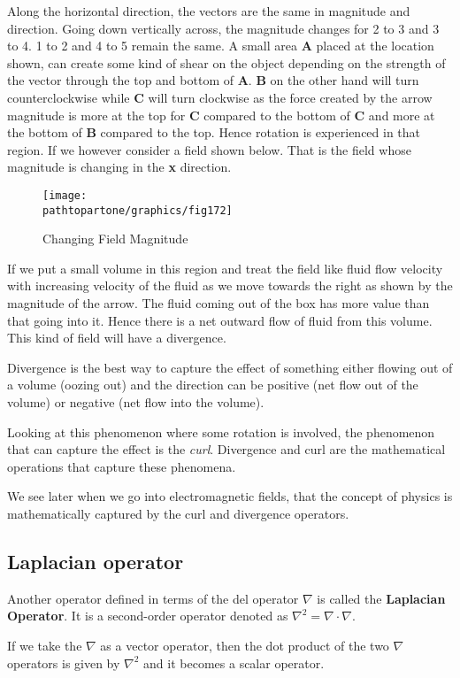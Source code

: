 Along the horizontal direction, the vectors are the same in magnitude and direction. Going down vertically across, the magnitude changes for 2 to 3 and 3 to 4. 1 to 2 and 4 to 5 remain the same. A small area \textbf{A} placed at the location shown, can create some kind of shear on the object depending on the strength of the vector through the top and bottom of \textbf{A}. \textbf{B} on the other hand will turn counterclockwise while \textbf{C} will turn clockwise as the force created by the arrow magnitude is more at the top for \textbf{C} compared to the bottom of \textbf{C} and more at the bottom of \textbf{B} compared to the top. Hence rotation is experienced in that region. If we however consider a field shown below. That is the field whose magnitude is changing in the \textbf{x} direction.
\begin{figure}[h]
\centering
\texttt{[image: \\pathtopartone/graphics/fig172]}
\caption{Changing Field Magnitude}
\end{figure}

If we put a small volume in this region and treat the field like fluid flow velocity with increasing velocity of the fluid as we move towards the right as shown by the magnitude of the arrow. The fluid coming out of the box has more value than that going into it. Hence there is a net outward flow of fluid from this volume. This kind of field will have a divergence.

Divergence is the best way to capture the effect of something either flowing out of a volume (oozing out) and the direction can be positive (net flow out of the volume) or negative (net flow into the volume).

Looking at this phenomenon where some rotation is involved, the phenomenon that can capture the effect is the \textit{curl}. Divergence and curl are the mathematical operations that capture these phenomena.

We see later when we go into electromagnetic fields, that the concept of physics is mathematically captured by the curl and divergence operators.

\subsection{Laplacian operator}
Another operator defined in terms of the del operator $\nabla$ is called the \textbf{Laplacian Operator}. It is a second-order operator denoted as $\nabla^2 = \nabla \cdot \nabla$.

If we take the $\nabla$ as a vector operator, then the dot product of the two $\nabla$ operators is given by $\nabla^2$ and it becomes a scalar operator.

